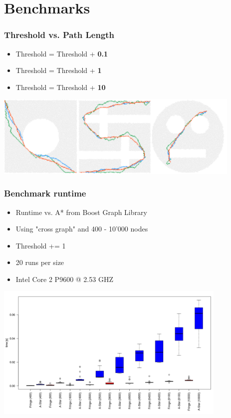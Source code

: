 \documentclass{beamer}
\begin{document}
\section{Benchmarks}


\begin{frame}
\frametitle{Threshold vs. Path Length}
\begin{itemize}
\item \textcolor{0.1}{Threshold = Threshold + \textbf{0.1}}
\item \textcolor{1}{Threshold = Threshold + \textbf{1}}
\item \textcolor{10}{Threshold = Threshold + \textbf{10}}
\end{itemize}
\begin{center}
	\includegraphics[height=112pt]{benchmark_path.pdf}
\end{center}
\end{frame}




\begin{frame}
\frametitle{Benchmark runtime}
\begin{itemize}
\item Runtime vs. A* from Boost Graph Library
\item Using "cross graph" and 400 - 10'000 nodes
\item Threshold += 1
\item 20 runs per size
\item Intel Core 2 P9600 @ 2.53 GHZ
\end{itemize}
\begin{center}
	\includegraphics[height=184pt]{boxplot.png}
\end{center}
\end{frame}
\end{document}
